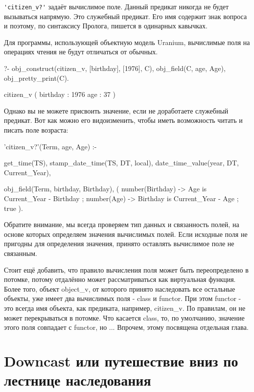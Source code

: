 \documentclass[a4paper]{book}
\def\ur{Uranium}
\begin{document}
\verb|'citizen_v?'| задаёт вычислимое поле. Данный предикат
никогда не будет вызываться напрямую. Это служебный
предикат. Его имя содержит знак вопроса и поэтому, по синтаксису
Пролога, пишется в одинарных кавычках.

Для программы, использующей объектную модель \ur, вычислимые 
поля на операциях чтения не будут отличаться от обычных.

\begin{example}{}{}
?- obj_construct(citizen_v, [birthday], [1976], C), 
   obj_field(C, age, Age), 
   obj_pretty_print(C).

citizen_v ( 
  birthday : 1976 
  age : 37 
) 
\end{example}

Однако вы не можете присвоить значение, если не доработаете
служебный предикат. Вот как можно его видоизменить, чтобы иметь
возможность читать и писать поле возраста:

\begin{example}{}{}
'citizen_v?'(Term, age, Age) :-

        get_time(TS),
        stamp_date_time(TS, DT, local),
        date_time_value(year, DT, Current_Year),
        
        obj_field(Term, birthday, Birthday),
        (  number(Birthday)
        -> Age is Current_Year - Birthday
        ;  number(Age)
        -> Birthday is Current_Year - Age
        ;  true %
        ).
        
\end{example}

Обратите внимание, мы всегда проверяем тип данных и связанность полей, на
основе которых определяем значения вычислимых полей. Если исходные поля не
пригодны для определения значения, принято оставлять вычислимое поле не
связанным.

Стоит ещё добавить, что правило вычисления поля может быть
переопределено в потомке, потому отдалённо может рассматриваться
как виртуальная функция. Более того, объект object_v, от
которого принято наследовать все остальные объекты, уже имеет два
вычислимых поля - class и functor. При этом functor - это всегда
имя объекта, как предиката, например, citizen_v. По правилам, он
не может перекрываться в потомке. Что касается class, то, по
умолчанию, значение этого поля совпадает с functor, но
... Впрочем, этому посвящена отдельная глава.


\section{Downcast или путешествие вниз по лестнице наследования}
\label{downcast}
\end{document}
